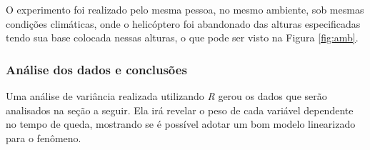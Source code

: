 O experimento foi realizado pelo mesma pessoa, no mesmo ambiente, sob mesmas condições climáticas, onde o helicóptero foi abandonado das alturas especificadas tendo sua base colocada nessas alturas, o que pode ser visto na Figura \ref{fig:amb}.

\subsubsection*{Análise dos dados e conclusões}

Uma análise de variância realizada utilizando \emph{R} gerou os dados que serão analisados na seção a seguir. Ela irá revelar o peso de cada variável dependente no tempo de queda, mostrando se é possível adotar um bom modelo linearizado para o fenômeno.

\newpage
\section*{}

